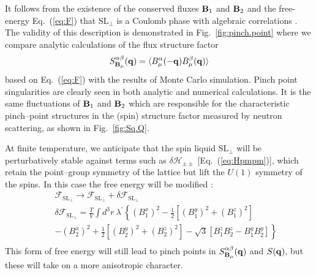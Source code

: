 \documentclass[apsrev4-1,prx,superscriptaddress,floatfix,twocolumn,longbibliography]{revtex4-1}
\begin{document}

It follows from the existence of the conserved fluxes ${\bf B}_1$
and ${\bf B}_2$ and the free-energy Eq.~(\ref{eq:F}) that $\text{SL}_\perp$ 
is a Coulomb phase with algebraic correlations \cite{henley10}.
%
The validity of this description is demonstrated in Fig.~\ref{fig:pinch.point}
where we compare analytic calculations of the flux structure factor
\begin{eqnarray}
S_{{\bf B}_{\mu}}^{\alpha \beta}(\mathbf{q})=
\langle
B^{\alpha}_{\mu}(-\mathbf{q})
B^{\beta}_{\mu}(\mathbf{q})
\rangle
\label{eq:S.mu}
\end{eqnarray}
based on Eq.~(\ref{eq:F}) with the results of Monte Carlo
simulation.
%
Pinch point singularities are clearly seen in both analytic
and numerical calculations.
%
It is the same fluctuations of ${\bf B}_1$
and ${\bf B}_2$ which are responsible for the characteristic pinch--point 
structures in the (spin) structure factor 
measured by neutron scattering, as shown in Fig.~\ref{fig:Sq.Q}.


At finite temperature, we anticipate that the spin liquid $\text{SL}_\perp$ 
will be perturbatively stable against terms such as $\delta\mathcal{H}_{\pm\pm}$ 
[Eq.~(\ref{eq:Hpmpm})], which retain the point--group symmetry of the lattice but lift 
the $U(1)$ symmetry of the spins.   
%
In this case the free energy will be modified :
%
\begin{eqnarray}
&&{\mathcal F}_{\text{SL}_\perp} 
   \to {\mathcal F}_{\text{SL}_\perp} + \delta{\mathcal F}_{\text{SL}_\perp} \\
&&
\delta{\mathcal F}_{\text{SL}_\perp}
= \frac{T}{V} \int d^3r \
\lambda^{\prime}
 \left\{ 
 \left( B_1^x \right)^2
 -\frac{1}{2}
   \left[ \left( B_1^y \right)^2 
 +  \left( B_1^z \right)^2 \right]
 \right.
\nonumber \\
&&
\left. 
  - \left( B_2^x \right)^2
   + \frac{1}{2} 
      \left[ \left( B_2^y \right)^2 + \left( B_2^z \right)^2 \right] 
- \sqrt{3} 
\left[  B_1^z B_2^z  -   B_1^y B_2^y \right] \right\} \nonumber \\
\label{eq:deltaF}
\end{eqnarray}
%
This form of free energy will still lead to pinch points in 
$S_{{\bf B}_{\mu}}^{\alpha \beta}(\mathbf{q})$ and $S({\bf q})$, 
but these will take on a more anisotropic character.
\end{document}
